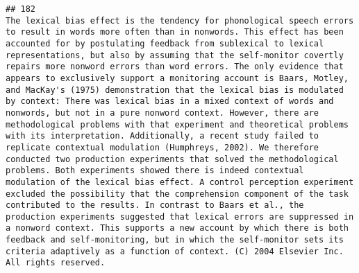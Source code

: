 \documentclass[
  english,
  man]{apa6}
\begin{document}
\begin{verbatim}
## 182                                                                                                                                                                                                                                                                                                                                                                                                                                                                                                                                                                                                                                                                                                                                                                                                                                                                                                                                                                                                                                                                                                                                                                        The lexical bias effect is the tendency for phonological speech errors to result in words more often than in nonwords. This effect has been accounted for by postulating feedback from sublexical to lexical representations, but also by assuming that the self-monitor covertly repairs more nonword errors than word errors. The only evidence that appears to exclusively support a monitoring account is Baars, Motley, and MacKay's (1975) demonstration that the lexical bias is modulated by context: There was lexical bias in a mixed context of words and nonwords, but not in a pure nonword context. However, there are methodological problems with that experiment and theoretical problems with its interpretation. Additionally, a recent study failed to replicate contextual modulation (Humphreys, 2002). We therefore conducted two production experiments that solved the methodological problems. Both experiments showed there is indeed contextual modulation of the lexical bias effect. A control perception experiment excluded the possibility that the comprehension component of the task contributed to the results. In contrast to Baars et al., the production experiments suggested that lexical errors are suppressed in a nonword context. This supports a new account by which there is both feedback and self-monitoring, but in which the self-monitor sets its criteria adaptively as a function of context. (C) 2004 Elsevier Inc. All rights reserved.

\end{verbatim}
\end{document}
